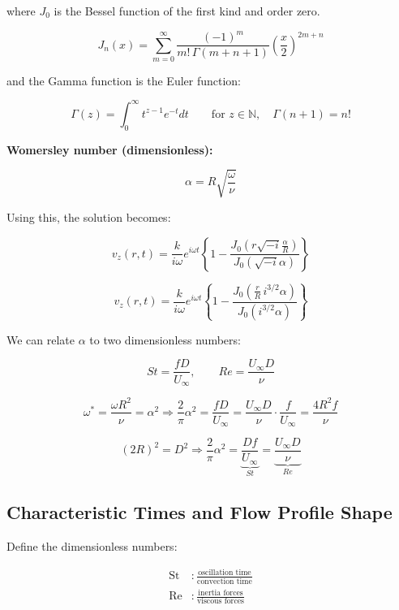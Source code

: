 \documentclass[a4paper,12pt]{article}
\begin{document}
where \( J_0 \) is the Bessel function of the first kind and order zero.

\[
J_n(x) = \sum_{m=0}^{\infty} \frac{(-1)^m}{m! \, \Gamma(m+n+1)} \left( \frac{x}{2} \right)^{2m+n}
\]

and the Gamma function is the Euler function:

\[
\Gamma(z) = \int_0^{\infty} t^{z-1} e^{-t} dt \qquad \text{for } z \in \mathbb{N}, \quad \Gamma(n+1) = n!
\]

\bigskip

\textbf{Womersley number (dimensionless):}

\[
\alpha = R \sqrt{\frac{\omega}{\nu}}
\]

Using this, the solution becomes:

\[
v_z(r,t) = \frac{k}{i\omega} e^{i\omega t} \left\{ 1 - \frac{J_0 \left( r \sqrt{-i} \frac{\alpha}{R} \right)}{J_0 \left( \sqrt{-i} \alpha \right)} \right\}
\]

\[
\boxed{
v_z(r,t) = \frac{k}{i\omega} e^{i\omega t} \left\{ 1 - \frac{J_0 \left( \frac{r}{R} \, i^{3/2} \alpha \right)}{J_0 \left( i^{3/2} \alpha \right)} \right\}
}
\]

\bigskip

We can relate \( \alpha \) to two dimensionless numbers:

\[
St = \frac{fD}{U_\infty}, \qquad Re = \frac{U_\infty D}{\nu}
\]

\[
\omega^* = \frac{\omega R^2}{\nu} = \alpha^2 \Rightarrow
\frac{2}{\pi} \alpha^2 = \frac{fD}{U_\infty} = \frac{U_\infty D}{\nu} \cdot \frac{f}{U_\infty} = \frac{4 R^2 f}{\nu}
\]

\[
(2R)^2 = D^2 \Rightarrow \frac{2}{\pi} \alpha^2 = \underbrace{\frac{Df}{U_\infty}}_{St} = \underbrace{\frac{U_\infty D}{\nu}}_{Re}
\]

\subsection*{Characteristic Times and Flow Profile Shape}

Define the dimensionless numbers:

\begin{align*}
\text{St} & : \frac{\text{oscillation time}}{\text{convection time}} \\[1.2em]
\text{Re} & : \frac{\text{inertia forces}}{\text{viscous forces}}
\end{align*}



\bigskip
\end{document}

